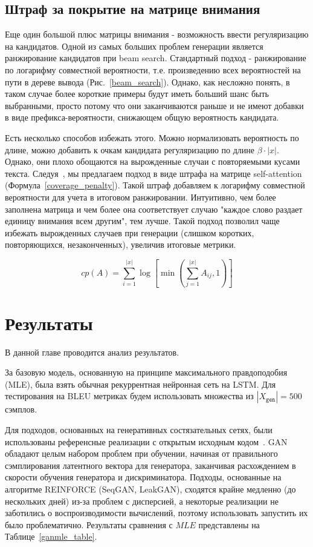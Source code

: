 \documentclass{spbau-diploma}
\begin{document}
\subsection{Штраф за покрытие на матрице внимания}
Еще один большой плюс матрицы внимания - возможность ввести регуляризацию на
кандидатов. Одной из самых больших проблем генерации является ранжирование 
кандидатов при beam search. Стандартный подход - ранжирование по логарифму 
совместной вероятности, т.е. произведению всех вероятностей на пути в дереве 
вывода (Рис.~\ref{beam_search}). Однако, как несложно понять, в таком случае 
более короткие примеры будут иметь больший шанс быть выбранными, просто потому 
что они заканчиваются раньше и не имеют добавки в виде префикса-вероятности, 
снижающем общую вероятность кандидата. 

Есть несколько способов избежать этого. Можно нормализовать вероятность по 
длине, можно добавить к очкам кандидата регуляризацию по длине 
$\beta \cdot |x|$. Однако, они плохо обощаются на вырожденные случаи с 
повторяемыми кусами текста. Следуя~\cite{1703.03906}, мы предлагаем подход в 
виде штрафа на матрице self-attention (Формула~\ref{coverage_penalty}). Такой
штраф добавляем к логарифму совместной вероятности для учета в итоговом 
ранжировании. Интуитивно, чем более заполнена матрица и чем более она 
соответствует случаю "каждое слово раздает единицу внимания всем другим", тем
лучше. Такой подход позволил чаще избежать вырожденных случаев
при генерации (слишком коротких, повторяющихся, незаконченных), увеличив 
итоговые метрики.

\begin{equation}
\label{coverage_penalty}
cp(A) = \sum\limits^{|x|}_{i=1}{\log \left[\min(\sum\limits^{|x|}_{j=1}{A_{ij}}, 1) \right]}
\end{equation}

\section{Результаты}
В данной главе проводится анализ результатов.

За базовую модель, основанную на принципе максимального правдоподобия 
(MLE), была взять обычная рекуррентная нейронная сеть на LSTM. Для 
тестирования на BLEU метриках будем использовать множества из 
$|X_{\texttt{gen}}|=500$ сэмплов.

Для подходов, основанных на генеративных состязательных сетях, были 
использованы референсные реализации с открытым исходным 
кодом~\cite{seqgan, leakgan, gsgan}.
GAN обладают
целым набором проблем при обучении, начиная от правильного сэмплирования 
латентного вектора для генератора, заканчивая расхождением в скорости обучения 
генератора и дискриминатора. Подходы, основанные на алгоритме 
REINFORCE (SeqGAN, LeakGAN), сходятся крайне медленно (до нескольких дней) 
из-за проблем с дисперсией, а некоторые реализации не заботились о 
воспроизводимости вычислений, поэтому использовать запустить их было 
проблематично. Результаты сравнения с $MLE$ представлены на 
Таблице~\ref{ganmle_table}.
\end{document}
